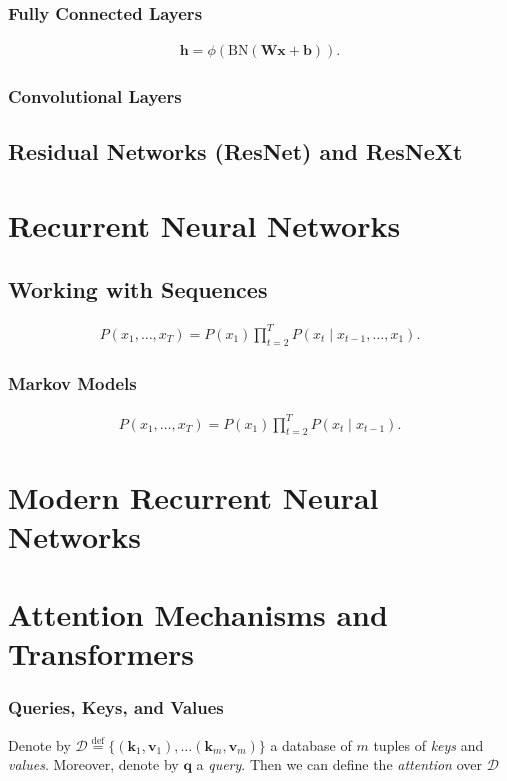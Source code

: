 \documentclass[a4paper,12pt]{article}
\theoremstyle{definition}
\begin{document}
\subsubsection*{Fully Connected Layers}

\begin{align*}
    \mathbf{h} = \phi(\mathrm{BN}(\mathbf{W}\mathbf{x} + \mathbf{b}) ).
\end{align*}


\subsubsection*{Convolutional Layers}


\subsection*{Residual Networks (ResNet) and ResNeXt}
\section{Recurrent Neural Networks}
\subsection{Working with Sequences}


\begin{align*}
    P(x_1, \ldots, x_T) = P(x_1) \prod_{t=2}^T P(x_t \mid x_{t-1}, \ldots, x_1).
\end{align*}


\subsubsection*{Markov Models}

\begin{align*}
    P(x_1, \ldots, x_T) = P(x_1) \prod_{t=2}^T P(x_t \mid x_{t-1}).
\end{align*}

\section{Modern Recurrent Neural Networks}

\section{Attention Mechanisms and Transformers}
\subsubsection*{Queries, Keys, and Values}
Denote by $\mathcal{D} \stackrel{\mathrm{def}}{=} \{(\mathbf{k}_1, \mathbf{v}_1), \ldots (\mathbf{k}_m, \mathbf{v}_m)\}$ a database of $m$ tuples of \emph{keys} and \emph{values}.
Moreover, denote by $\mathbf{q}$ a \emph{query}. Then we can define the \emph{attention} over $\mathcal{D}$
\end{document}
